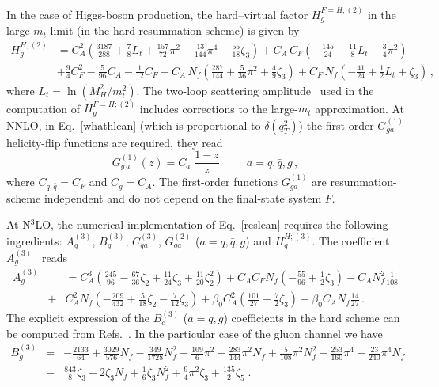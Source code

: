 \documentclass[12pt]{article}
\def\beeq{\begin{eqnarray}}
\def\eeeq{\end{eqnarray}}
\def\nn{\nonumber}
\newcommand\f[2]{\frac{#1}{#2}}
\DeclareRobustCommand{\qt}{q_T}
\begin{document}
In the case of Higgs-boson production, the hard--virtual factor $H^{F=H;(2)}_{g}$ in the large-$m_t$ limit (in the hard resummation scheme) is given by~\cite{Catani:2011kr}
\begin{align}
\label{H2g}
H_g^{H;(2)}&=C_A^2\left(
\f{3187}{288}+\f{7}{8}L_t+\f{157}{72}\pi^2+\f{13}{144}\pi^4-\f{55}{18}\zeta_3\right)+C_A\, C_F\left(-\f{145}{24}-\f{11}{8}L_t-\f{3}{4}\pi^2\right)\nn\\
&+\f{9}{4}C_F^2
-\f{5}{96}C_A-\f{1}{12}C_F-C_A\, N_f\left(\f{287}{144}+\f{5}{36}\pi^2+\f{4}{9}\zeta_3\right)
+C_F\, N_f\left(-\f{41}{24}+\f{1}{2}L_t+\zeta_3\right)\, ,
\end{align}
where $L_t=\ln (M_H^2/m_t^2)$. The two-loop scattering amplitude~\cite{Harlander:2009bw}  used in the computation of  $H^{F=H;(2)}_{g}$ includes corrections to the large-$m_t$ approximation.
At NNLO, in Eq.~\eqref{whathlean} (which is proportional to $\delta(\qt^{2})$) the first order $G_{ga}^{(1)}$ helicity-flip functions are required, they read~\cite{Catani:2010pd}
\begin{equation}
G_{g \,a}^{(1)}(z) = C_a \;\f{1-z}{z}~~~~~~~~~~~a=q,\bar{q},g\, ,
\end{equation}
where $C_{q;\bar{q}}=C_{F}$ and $C_g=C_{A}$. The first-order functions $G_{ga}^{(1)}$ are resummation-scheme independent and do not depend on the final-state system $F$.

At N$^{3}$LO, the numerical implementation of Eq.~\eqref{reslean} requires the following ingredients: $A^{(3)}_{g}$, $B^{(3)}_{g}$, $C^{(3)}_{ga}$, $G^{(2)}_{ga}$ ($a=q,{\bar q},g$) and $H^{H;(3)}_{g}$. The coefficient $A_g^{(3)}$~\cite{Becher:2010tm} reads
\beeq
\label{acoeff}
A_g^{(3)}\!\!\!&&\!\!\!\!\!\!\!\!  =  C_A^3 \left( \frac{245}{96} - \frac{67}{36}\zeta_2
 + \frac{11}{24}\zeta_3 + \frac{11}{20}\zeta_2^2\right) 
 + C_A C_F N_f \left(-\frac{55}{96} + \frac{1}{2}\zeta_3\right)
 - C_A N_f^2 \frac{1}{108} \nn\\
 &+& \!\!C_A^2 N_f \left(-\frac{209}{432} + \frac{5}{18}\zeta_2 - \frac{7}{12} \zeta_3\right)  
 + \beta_{0} C_A^2\left(\frac{101}{27}-\frac{7}{2}\zeta_{3}\right)- \beta_{0} C_A N_f \frac{14}{27}\,.
\eeeq
The explicit expression of the $B_c^{(3)}$ ($a=q,g$) coefficients in the hard scheme can be computed from Refs.~\cite{Li:2016ctv,Vladimirov:2016dll}. In the particular case of the gluon channel we have
\beeq
B_g^{(3)}&=& - \f{2133}{64} +  \f{3029}{576} N_{f} - \f{349}{1728} N_{f}^{2}  + \f{109}{6} \pi^{2} - \f{283}{144} \pi^{2}  N_{f} + \f{5}{108} \pi^{2}  N_{f}^{2}-\f{253}{160} \pi^{4}+\f{23}{240} \pi^{4} N_{f}\nn\\
&-& \f{843}{8} \zeta_{3} + 2 \zeta_{3} N_{f} + \f{1}{6} \zeta_{3} N_{f}^{2} + \f{9}{4} \pi^{2}  \zeta_{3} + \f{135}{2}  \zeta_{5}\;.
\eeeq
\end{document}
